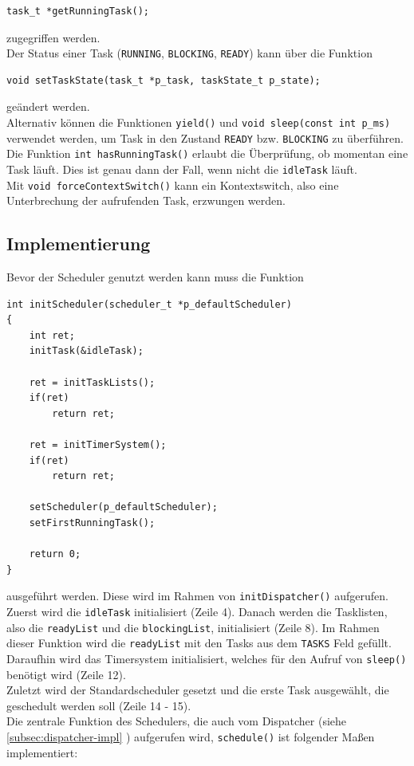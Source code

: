 \documentclass[fontsize=12pt, toc=bibliography, notitlepage]{scrreprt}
\newcommand{\refnn}[1]{\ref{#1} \nameref{#1}}
\begin{document}
\begin{lstlisting}[title=scheduler.h]
task_t *getRunningTask();
\end{lstlisting}

zugegriffen werden.\\

Der Status einer Task (\lstinline$RUNNING$, \lstinline$BLOCKING$, \lstinline$READY$) kann über die Funktion

\begin{lstlisting}[title=scheduler.h]
void setTaskState(task_t *p_task, taskState_t p_state);
\end{lstlisting}

geändert werden.\\
Alternativ können die Funktionen \lstinline$yield()$ und \lstinline$void sleep(const int p_ms)$ verwendet werden, um Task in den Zustand \lstinline$READY$ bzw. \lstinline$BLOCKING$ zu überführen.\\
Die Funktion \lstinline$int hasRunningTask()$ erlaubt die Überprüfung, ob momentan eine Task läuft. Dies ist genau dann der Fall, wenn nicht die \lstinline$idleTask$ läuft.\\
Mit \lstinline$void forceContextSwitch()$ kann ein Kontextswitch, also eine Unterbrechung der aufrufenden Task, erzwungen werden.

\subsection{Implementierung}
\label{subsec:scheduler-impl}
Bevor der Scheduler genutzt werden kann muss die Funktion

\begin{lstlisting}[title=scheduler.c]
int initScheduler(scheduler_t *p_defaultScheduler)
{
	int ret;
	initTask(&idleTask);
	
	ret = initTaskLists();
	if(ret)
		return ret;
		
	ret = initTimerSystem();
	if(ret)
		return ret;
		
	setScheduler(p_defaultScheduler);
	setFirstRunningTask();
	
	return 0;
}
\end{lstlisting}

ausgeführt werden. Diese wird im Rahmen von \lstinline$initDispatcher()$ aufgerufen.\\
Zuerst wird die \lstinline$idleTask$ initialisiert (Zeile 4). Danach werden die Tasklisten, also die \lstinline$readyList$ und die \lstinline$blockingList$, initialisiert (Zeile 8). Im Rahmen dieser Funktion wird die \lstinline$readyList$ mit den Tasks aus dem \lstinline$TASKS$ Feld gefüllt.\\
Daraufhin wird das Timersystem initialisiert, welches für den Aufruf von \lstinline$sleep()$ benötigt wird (Zeile 12).\\
Zuletzt wird der Standardscheduler gesetzt und die erste Task ausgewählt, die geschedult werden soll (Zeile 14 - 15).\\
Die zentrale Funktion des Schedulers, die auch vom Dispatcher (siehe \refnn{subsec:dispatcher-impl}) aufgerufen wird, \lstinline$schedule()$ ist folgender Maßen implementiert:
\end{document}
